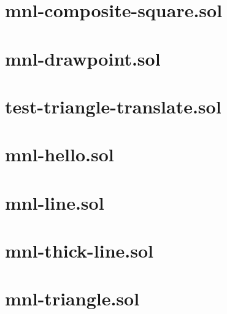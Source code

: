\section{mnl-composite-square.sol}


\section{mnl-drawpoint.sol}


\section{test-triangle-translate.sol}


\section{mnl-hello.sol}


\section{mnl-line.sol}


\section{mnl-thick-line.sol}


\section{mnl-triangle.sol}


